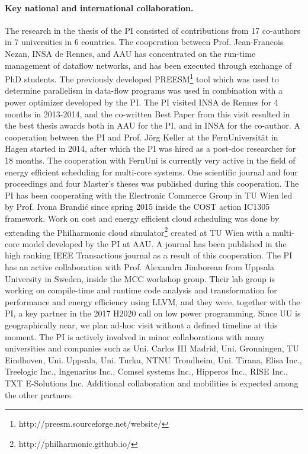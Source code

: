\documentclass{article}
\begin{document}
\paragraph{Key national and international collaboration.}
The research in the thesis of the PI consisted of contributions from 17 co-authors in 7 universities in 6 countries.
The cooperation between Prof. Jean-Francois Nezan, INSA de Rennes, and AAU has concentrated on the run-time management of dataflow networks, 
and has been executed through exchange of PhD students.
The previously developed PREESM\footnote{http://preesm.sourceforge.net/website/} tool which was used to determine parallelism in data-flow programs was used in combination with a power optimizer developed by the PI. 
The PI visited INSA de Rennes for 4 months in 2013-2014, and the co-written Best Paper from this visit resulted in the best thesis awards both in AAU for the PI, and in INSA for the co-author.
A cooperation between the PI and Prof. J\"{o}rg Keller at the FernUniversit\"{a}t in Hagen started in 2014, after which the PI was hired as a post-doc researcher for 18 months.
The cooperation with FernUni is currently very active in the field of energy efficient scheduling for multi-core systems. 
One scientific journal and four proceedings and four Master's theses was published during this cooperation.
The PI has been cooperating with the Electronic Commerce Group in TU Wien led by Prof. Ivona Brandi\'{c} since spring 2015 inside the COST action IC1305 framework. 
Work on cost and energy efficient cloud scheduling was done by extending the Philharmonic cloud simulator\footnote{http://philharmonic.github.io/} created at TU Wien with a multi-core model developed by the PI at AAU. 
A journal has been published in the high ranking IEEE Transactions journal as a result of this cooperation.
The PI has an active collaboration with Prof. Alexandra Jimborean from Uppsala University in Sweden, inside the MCC workshop group.
Their lab group is working on compile-time and runtime code analysis and transformation for performance and energy efficiency using LLVM, and they were, together with the PI, a key partner in the 2017 H2020 call on low power programming.
Since UU is geographically near, we plan ad-hoc visit without a defined timeline at this moment.
The PI is actively involved in minor collaborations with many universities and companies such as Uni. Carlos III Madrid, Uni. Gronningen, TU Eindhoven, Uni. Uppsala, Uni. Turku, NTNU Trondheim, Uni. Tirana, Elisa Inc., Treelogic Inc., Ingenarius Inc., Comsel systems Inc., Hipperos Inc., RISE Inc., TXT E-Solutions Inc.
Additional collaboration and mobilities is expected among the other partners.
\end{document}
